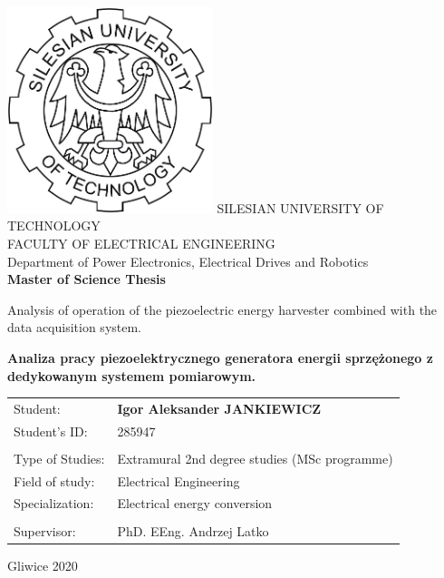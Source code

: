 \documentclass[12pt,a4paper]{article}
\begin{document}
\begin{titlepage}
    \centering
    \includegraphics[width=6cm]{logo.jpg} %
    \vskip1cm
    {\Large
        SILESIAN UNIVERSITY OF TECHNOLOGY\\
        FACULTY OF ELECTRICAL ENGINEERING\\
        \vskip0.5cm
        Department of Power Electronics, Electrical Drives and Robotics\\
    }
    \vskip1cm
    {\bfseries\huge
    Master of Science Thesis\\
    }
    \vskip0.5cm
    {\bfseries\large
    
Analysis of operation of the piezoelectric energy harvester combined with the data acquisition system. \\
    }
    \vskip0.5cm
    {\bfseries\normalsize
    Analiza pracy piezoelektrycznego generatora energii sprzężonego z dedykowanym systemem pomiarowym. \\
    }
    \vskip 1.5cm
    {\large
    \begin{tabular}{p{4cm} p{10cm}}
    Student: & {\bfseries\Large Igor Aleksander JANKIEWICZ}\\
    Student's ID: & 285947\\
        &   \\
    Type of Studies: & Extramural 2nd degree studies (MSc programme)\\
    Field of study: & Electrical Engineering\\
    Specialization: & Electrical energy conversion\\
        &   \\
    Supervisor: & PhD. EEng. Andrzej Latko\\
    \end{tabular}
    }
    \vskip2cm
    {\large
    Gliwice 2020}
\end{titlepage}

\newpage\null\thispagestyle{empty}\newpage
\end{document}
